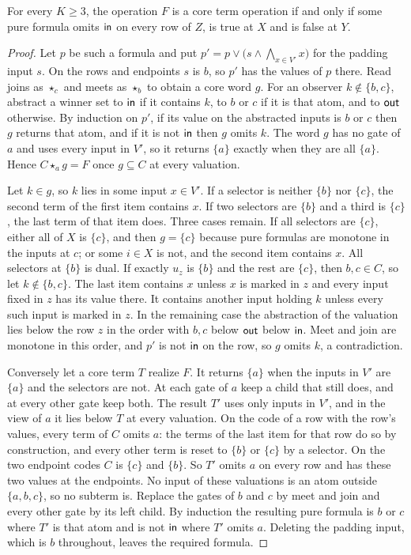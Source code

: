 \begin{theorem}
\label{core:thm:row-recognition}
For every $K\ge3$, the operation $F$ is a core term operation if and only
if some pure formula omits $\mathsf{in}$ on every row of $Z$, is true at $X$ and
is false at $Y$.
\end{theorem}
\begin{proof}
Let $p$ be such a formula and put
$p'=p\vee\bigl(s\wedge\bigwedge_{x\in V'}x\bigr)$ for the padding input
$s$. On the rows and endpoints $s$ is $b$, so $p'$ has the values of $p$
there. Read joins as $\star_c$ and meets as $\star_b$ to obtain a core word
$g$. For an observer $k\notin\{b,c\}$, abstract a winner set to $\mathsf{in}$ if
it contains $k$, to $b$ or $c$ if it is that atom, and to $\mathsf{out}$ otherwise.
By induction on $p'$, if its value on the abstracted inputs is $b$ or $c$
then $g$ returns that atom, and if it is not $\mathsf{in}$ then $g$ omits $k$. The
word $g$ has no gate of $a$ and uses every input in $V'$, so it returns
$\{a\}$ exactly when they are all $\{a\}$. Hence $C\star_ag=F$ once
$g\subseteq C$ at every valuation.

Let $k\in g$, so $k$ lies in some input $x\in V'$. If a selector is
neither $\{b\}$ nor $\{c\}$, the second term of the first item contains
$x$. If two selectors are $\{b\}$ and a third is $\{c\}$, the last term of
that item does. Three cases remain. If all selectors are $\{c\}$, either
all of $X$ is $\{c\}$, and then $g=\{c\}$ because pure formulas are
monotone in the inputs at $c$; or some $i\in X$ is not, and the second
item contains $x$. All selectors at $\{b\}$ is dual. If exactly $u_z$ is
$\{b\}$ and the rest are $\{c\}$, then $b,c\in C$, so let
$k\notin\{b,c\}$. The last item contains $x$ unless $x$ is marked in $z$
and every input fixed in $z$ has its value there. It contains another
input holding $k$ unless every such input is marked in $z$. In the
remaining case the abstraction of the valuation lies below the row $z$ in
the order with $b,c$ below $\mathsf{out}$ below $\mathsf{in}$. Meet and join are monotone
in this order, and $p'$ is not $\mathsf{in}$ on the row, so $g$ omits $k$, a
contradiction.

Conversely let a core term $T$ realize $F$. It returns $\{a\}$ when the
inputs in $V'$ are $\{a\}$ and the selectors are not. At each gate of $a$
keep a child that still does, and at every other gate keep both. The
result $T'$ uses only inputs in $V'$, and in the view of $a$ it lies
below $T$ at every valuation. On the code of a row with the row's values,
every term of $C$ omits $a$: the terms of the last item for that row do
so by construction, and every other term is reset to $\{b\}$ or $\{c\}$
by a selector. On the two endpoint codes $C$ is $\{c\}$ and $\{b\}$. So
$T'$ omits $a$ on every row and has these two values at the endpoints. No
input of these valuations is an atom outside $\{a,b,c\}$, so no subterm
is. Replace the gates of $b$ and $c$ by meet and join and every other
gate by its left child. By induction the resulting pure formula is $b$
or $c$ where $T'$ is that atom and is not $\mathsf{in}$ where $T'$ omits $a$.
Deleting the padding input, which is $b$ throughout, leaves the required
formula.
\end{proof}

